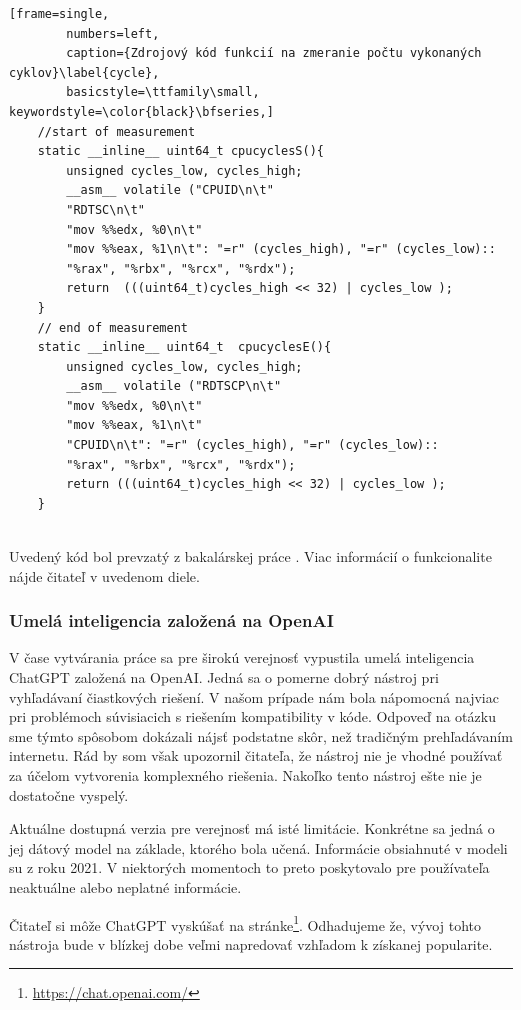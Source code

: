  \begin{minipage}{\linewidth} 	
	\begin{lstlisting}[frame=single,
		numbers=left,
		caption={Zdrojový kód funkcií na zmeranie počtu vykonaných cyklov}\label{cycle},
		basicstyle=\ttfamily\small, keywordstyle=\color{black}\bfseries,]
	//start of measurement
	static __inline__ uint64_t cpucyclesS(){
		unsigned cycles_low, cycles_high;
		__asm__ volatile ("CPUID\n\t"
		"RDTSC\n\t"
		"mov %%edx, %0\n\t"
		"mov %%eax, %1\n\t": "=r" (cycles_high), "=r" (cycles_low)::
		"%rax", "%rbx", "%rcx", "%rdx");
		return  (((uint64_t)cycles_high << 32) | cycles_low );
	}
	// end of measurement
	static __inline__ uint64_t  cpucyclesE(){
		unsigned cycles_low, cycles_high;
		__asm__ volatile ("RDTSCP\n\t"
		"mov %%edx, %0\n\t"
		"mov %%eax, %1\n\t"
		"CPUID\n\t": "=r" (cycles_high), "=r" (cycles_low)::
		"%rax", "%rbx", "%rcx", "%rdx");
		return (((uint64_t)cycles_high << 32) | cycles_low );
	}
	\end{lstlisting}
\end{minipage}\\ 
Uvedený kód bol prevzatý z bakalárskej práce \cite{bc}. Viac informácií o funkcionalite nájde čitateľ v uvedenom diele. 

\subsubsection{Umelá inteligencia založená na OpenAI} 
V čase vytvárania práce sa pre širokú verejnosť vypustila umelá inteligencia ChatGPT založená na OpenAI. Jedná sa o pomerne dobrý nástroj pri vyhľadávaní čiastkových riešení. V našom prípade nám bola nápomocná najviac pri problémoch súvisiacich s riešením kompatibility v kóde. Odpoveď na otázku sme týmto spôsobom dokázali nájsť podstatne skôr, než tradičným prehľadávaním internetu. Rád by som však upozornil čitateľa, že nástroj nie je vhodné používať za účelom vytvorenia komplexného riešenia. Nakoľko tento nástroj ešte nie je dostatočne vyspelý. 
  
Aktuálne dostupná verzia pre verejnosť má isté limitácie. Konkrétne sa jedná o jej dátový model na základe, ktorého bola učená. Informácie obsiahnuté v modeli su z roku 2021. V niektorých momentoch to preto poskytovalo pre používateľa neaktuálne alebo neplatné informácie.
 
Čitateľ si môže ChatGPT vyskúšať na stránke\footnote{\url{https://chat.openai.com/}}. Odhadujeme že, vývoj tohto nástroja bude v blízkej dobe veľmi napredovať vzhľadom k získanej popularite. 
